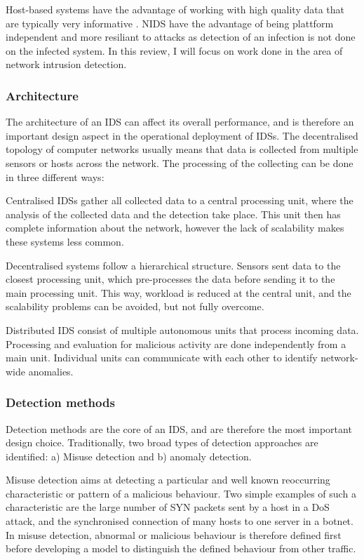 \documentclass[a4paper,12pt,twoside]{report}
\begin{document}
Host-based systems have the advantage of working with high quality data that   are   typically   very   informative \cite{lazarevic2005intrusion}. NIDS have the advantage of being plattform independent and more resiliant to attacks as detection of an infection is not done on the infected system. In this review, I will focus on work done in the area of network intrusion detection.





\subsubsection*{Architecture}

The architecture of an IDS can affect its overall performance, and is therefore an important design aspect in the operational deployment of IDSs. The decentralised topology of computer networks usually means that data is collected from multiple sensors or hosts across the network. The processing of the collecting can be done in three different ways:

Centralised IDSs gather all collected data to a central processing unit,  where  the 
analysis of the collected data and the detection take place. This unit then has complete information about the network, however the lack of scalability makes these systems less common. 

Decentralised systems follow a hierarchical structure. Sensors sent data to the closest processing unit, which pre-processes the data before sending it to the main processing unit. This way, workload is reduced at the central unit, and
the scalability problems can be avoided, but not fully overcome. 

Distributed IDS consist of multiple autonomous units that process incoming data. Processing and evaluation for malicious activity are done independently from a main unit. Individual units can communicate with each other to identify network-wide anomalies.


\subsubsection*{Detection methods}

Detection methods are the core of an IDS, and are therefore the most important design choice. Traditionally, two broad types of detection approaches are identified: a) Misuse detection and b) anomaly detection. 

Misuse detection aims at detecting a particular and well known reoccurring characteristic or pattern of a malicious behaviour. Two simple examples of such a characteristic are the large number of SYN packets sent by a host in a DoS attack, and the synchronised connection of many hosts to one server in a botnet. In misuse detection, abnormal or malicious behaviour is therefore defined first before developing a model to distinguish the defined behaviour from other traffic.
\end{document}

